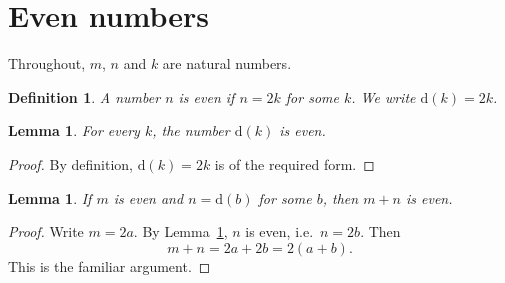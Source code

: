 \documentclass{amsart}
\newtheorem{lemma}[theorem]{Lemma}
\newtheorem{definition}[theorem]{Definition}
\numberwithin{equation}{section}
\newcommand{\dbl}{\mathrm{d}}
\begin{document}
\section{Even numbers}\label{sec:even}
Throughout, $m$, $n$ and $k$ are natural numbers.
\begin{definition}\label{def:even}
A number $n$ is \emph{even} if $n=2k$ for some $k$. We write $\dbl(k)=2k$.
\end{definition}
\begin{lemma}\label{lem:double}
For every $k$, the number $\dbl(k)$ is even.
\end{lemma}
\begin{proof}
By definition, $\dbl(k)=2k$ is of the required form.
\end{proof}
\begin{lemma}\label{lem:sum}
If $m$ is even and $n=\dbl(b)$ for some $b$, then $m+n$ is even.
\end{lemma}
\begin{proof}
Write $m=2a$. By Lemma~\ref{lem:double}, $n$ is even, i.e.\ $n=2b$.
Then
\begin{equation}\label{eq:sum}
m+n=2a+2b=2(a+b).
\end{equation}
This is the familiar argument.
\end{proof}
\end{document}
